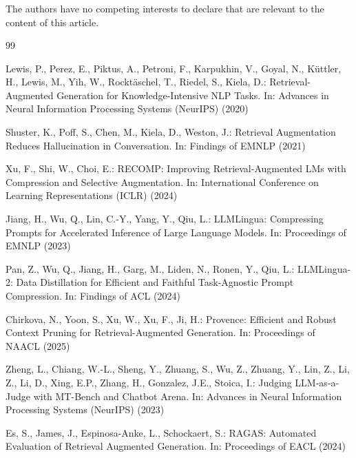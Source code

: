 \documentclass[runningheads]{llncs}
\begin{document}
\begin{credits}
\subsubsection{\discintname}
The authors have no competing interests to declare that are relevant to the
content of this article.
\end{credits}
%
\begin{thebibliography}{99}

Lewis, P., Perez, E., Piktus, A., Petroni, F., Karpukhin, V., Goyal, N.,
K\"{u}ttler, H., Lewis, M., Yih, W., Rockt\"{a}schel, T., Riedel, S., Kiela, D.:
Retrieval-Augmented Generation for Knowledge-Intensive NLP Tasks.
In: Advances in Neural Information Processing Systems (NeurIPS) (2020)

Shuster, K., Poff, S., Chen, M., Kiela, D., Weston, J.:
Retrieval Augmentation Reduces Hallucination in Conversation.
In: Findings of EMNLP (2021)

Xu, F., Shi, W., Choi, E.:
RECOMP: Improving Retrieval-Augmented LMs with Compression and Selective Augmentation.
In: International Conference on Learning Representations (ICLR) (2024)

Jiang, H., Wu, Q., Lin, C.-Y., Yang, Y., Qiu, L.:
LLMLingua: Compressing Prompts for Accelerated Inference of Large Language Models.
In: Proceedings of EMNLP (2023)

Pan, Z., Wu, Q., Jiang, H., Garg, M., Liden, N., Ronen, Y., Qiu, L.:
LLMLingua-2: Data Distillation for Efficient and Faithful Task-Agnostic Prompt Compression.
In: Findings of ACL (2024)

Chirkova, N., Yoon, S., Xu, W., Xu, F., Ji, H.:
Provence: Efficient and Robust Context Pruning for Retrieval-Augmented Generation.
In: Proceedings of NAACL (2025)

Zheng, L., Chiang, W.-L., Sheng, Y., Zhuang, S., Wu, Z., Zhuang, Y., Lin, Z.,
Li, Z., Li, D., Xing, E.P., Zhang, H., Gonzalez, J.E., Stoica, I.:
Judging LLM-as-a-Judge with MT-Bench and Chatbot Arena.
In: Advances in Neural Information Processing Systems (NeurIPS) (2023)

Es, S., James, J., Espinosa-Anke, L., Schockaert, S.:
RAGAS: Automated Evaluation of Retrieval Augmented Generation.
In: Proceedings of EACL (2024)


\end{thebibliography}
\end{document}
